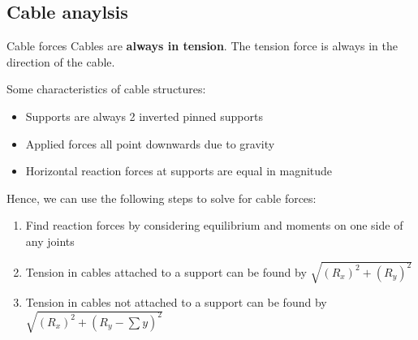 \subsection{Cable anaylsis}
\begin{definition}
    {Cable forces}
    Cables are \textbf{always in tension}. The tension force is always in the direction of the cable.
\end{definition}
Some characteristics of cable structures:
\begin{itemize}
    \item Supports are always 2 inverted pinned supports
    \item Applied forces all point downwards due to gravity
    \item Horizontal reaction forces at supports are equal in magnitude
\end{itemize}
Hence, we can use the following steps to solve for cable forces:
\begin{enumerate}
    \item Find reaction forces by considering equilibrium and moments on one side of any joints
    \item Tension in cables attached to a support can be found by $\sqrt{(R_x)^2+(R_y)^2}$
    \item Tension in cables not attached to a support can be found by $\sqrt{(R_x)^2+(R_y-\sum y)^2}$
\end{enumerate}